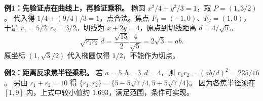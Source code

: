 \begin{examplebox}
\textbf{例1：先验证点在曲线上，再验证乘积。}
椭圆 $x^2/4+y^2/3=1$，取 $P=(1,3/2)$。
代入得 $1/4+(9/4)/3=1$，点合法。焦点 $F_1=(-1,0)$、$F_2=(1,0)$，
于是 $r_1=5/2,r_2=3/2$。切线为 $x+2y=4$，原点到切线距离 $d=4/\sqrt5$。
\[
\sqrt{r_1r_2}\,d=\frac{\sqrt{15}}2\frac4{\sqrt5}=2\sqrt3=ab.
\]
原坐标 $(1,\sqrt3/2)$ 代入椭圆仅得 $1/2$，不能作为切点。
\par\medskip\noindent
\textbf{例2：距离反求焦半径乘积。}
若 $a=5,b=3,d=4$，则 $r_1r_2=(ab/d)^2=225/16$。
另由 $r_1+r_2=10$ 得 $\{r_1,r_2\}=\{5-5\sqrt7/4,5+5\sqrt7/4\}$。
因为各焦半径须在 $[1,9]$ 内，上式中较小值约 $1.693$，满足范围，条件可实现。
\end{examplebox}
